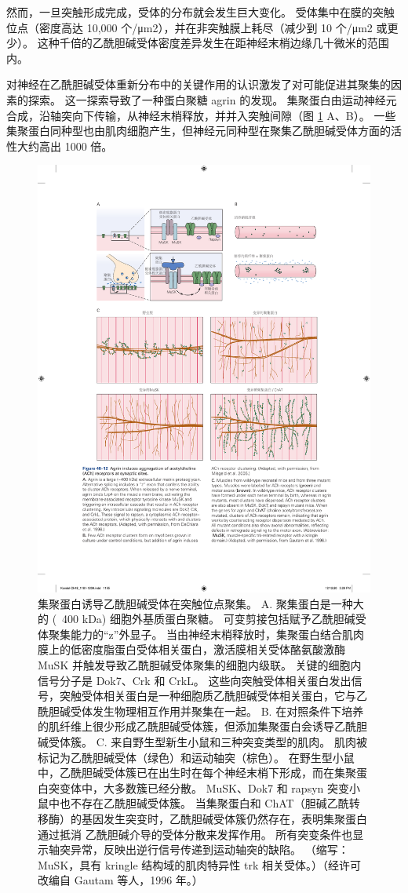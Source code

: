 然而，一旦突触形成完成，受体的分布就会发生巨大变化。
受体集中在膜的突触位点（密度高达 10,000 个/μm2），并在非突触膜上耗尽（减少到 10 个/μm2 或更少）。
这种千倍的乙酰胆碱受体密度差异发生在距神经末梢边缘几十微米的范围内。


对神经在乙酰胆碱受体重新分布中的关键作用的认识激发了对可能促进其聚集的因素的探索。
这一探索导致了一种蛋白聚糖 agrin 的发现。
集聚蛋白由运动神经元合成，沿轴突向下传输，从神经末梢释放，并并入突触间隙（图 \ref{fig:48_12} A、B）。
一些集聚蛋白同种型也由肌肉细胞产生，但神经元同种型在聚集乙酰胆碱受体方面的活性大约高出 1000 倍。


\begin{figure}[htbp]
	\centering
	\includegraphics[width=0.8\linewidth]{chap48/fig_48_12}
	\caption{集聚蛋白诱导乙酰胆碱受体在突触位点聚集。
		A. 聚集蛋白是一种大的 (~400 kDa) 细胞外基质蛋白聚糖。
		可变剪接包括赋予乙酰胆碱受体聚集能力的“z”外显子。
		当由神经末梢释放时，集聚蛋白结合肌肉膜上的低密度脂蛋白受体相关蛋白，激活膜相关受体酪氨酸激酶 MuSK 并触发导致乙酰胆碱受体聚集的细胞内级联。
		关键的细胞内信号分子是 Dok7、Crk 和 CrkL。
		这些向突触受体相关蛋白发出信号，突触受体相关蛋白是一种细胞质乙酰胆碱受体相关蛋白，它与乙酰胆碱受体发生物理相互作用并聚集在一起\cite{dechiara1996receptor}。
		B. 在对照条件下培养的肌纤维上很少形成乙酰胆碱受体簇，但添加集聚蛋白会诱导乙酰胆碱受体簇\cite{misgeld2005agrin}。
		C. 来自野生型新生小鼠和三种突变类型的肌肉。 肌肉被标记为乙酰胆碱受体（绿色）和运动轴突（棕色）。 在野生型小鼠中，乙酰胆碱受体簇已在出生时在每个神经末梢下形成，而在集聚蛋白突变体中，大多数簇已经分散。 MuSK、Dok7 和 rapsyn 突变小鼠中也不存在乙酰胆碱受体簇。 当集聚蛋白和 ChAT（胆碱乙酰转移酶）的基因发生突变时，乙酰胆碱受体簇仍然存在，表明集聚蛋白通过抵消 乙酰胆碱介导的受体分散来发挥作用。 所有突变条件也显示轴突异常，反映出逆行信号传递到运动轴突的缺陷。 （缩写：MuSK，具有 kringle 结构域的肌肉特异性 trk 相关受体。）（经许可改编自 Gautam 等人，1996 年。）}
	\label{fig:48_12}
\end{figure}

